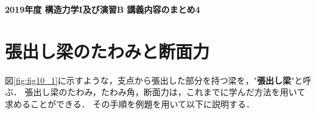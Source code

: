 \documentclass[10pt,a4j]{jarticle}
\newlength{\minitwocolumn}
\begin{document}
\newcommand{\fat}[1]{\mbox{\boldmath $#1$}}
\newcommand{\D}{\partial}
\newcommand{\w}{\omega}
\newcommand{\ga}{\alpha}
\newcommand{\gb}{\beta}
\newcommand{\gx}{\xi}
\newcommand{\gz}{\zeta}
\newcommand{\vhat}[1]{\hat{\fat{#1}}}
\newcommand{\spc}{\vspace{0.7\baselineskip}}
\newcommand{\halfspc}{\vspace{0.3\baselineskip}}

\newcommand{\twofig}[2]
 {
   \begin{figure}
     \begin{minipage}[t]{\minitwocolumn}
         \begin{center}   #1
         \end{center}
     \end{minipage}
         \hspace{\columnsep}
     \begin{minipage}[t]{\minitwocolumn}
         \begin{center} #2
         \end{center}
     \end{minipage}
   \end{figure}
 }
\begin{center}
	{\Large \bf 2019年度 構造力学I及び演習B 講義内容のまとめ4} \\
\end{center}
\section{張出し梁のたわみと断面力}
図\ref{fig:fig10_1}に示すような，支点から張出した部分を持つ梁を，"{\bf 張出し梁}"と呼ぶ．
張出し梁のたわみ，たわみ角，断面力は，これまでに学んだ方法を用いて求めることができる．
その手順を例題を用いて以下に説明する．
\end{document}
